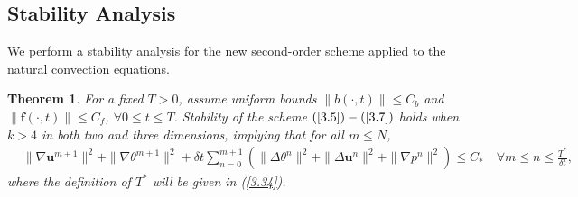 \documentclass[10pt]{article}
\newtheorem{theorem}{Theorem}[section]
\begin{document}
	\subsection{Stability Analysis}
	We perform a stability analysis for the new second-order scheme applied to the natural convection equations.
	\begin{theorem}\label{The3.1}
		{\it  For a fixed $T>0$, assume uniform bounds $\|b(\cdot,t)\|\leq C_b$ and $\|\bm{f}(\cdot,t)\|\leq C_f$, $\forall $$0\leqslant t\leqslant T$. Stability of the scheme $(\ref{3.5})-(\ref{3.7})$ holds when $k>4$ in both two and three dimensions, implying that for all $m\leq N$, 
			\begin{align}
				&\|\nabla\bm{u}^{m+1}\|^2+\|\nabla\theta^{m+1}\|^2+\delta t\sum_{n=0}^{m+1}(\|\Delta\theta^{n}\|^2+\|\Delta\bm{u}^n\|^2+\|\nabla p^{n}\|^2)\leq C_*  \quad    \forall m\leq n\leq\frac{T^*}{\delta t},
			\end{align}
			where the definition of \(T^*\) will be given in (\ref{3.34}).
		}
	\end{theorem}
\end{document}

